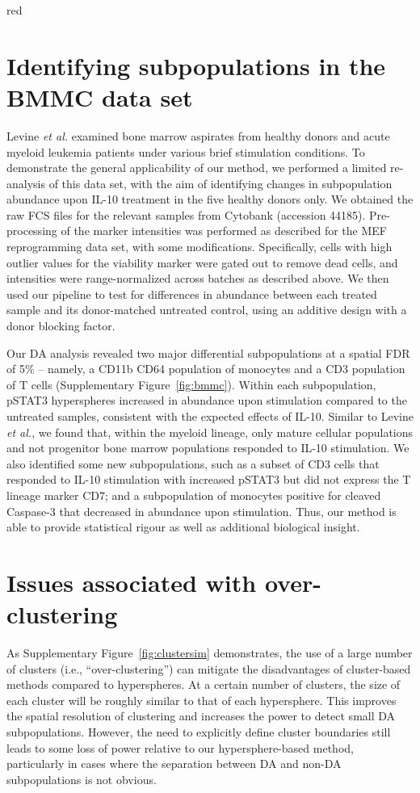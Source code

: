 \documentclass{article}
\begin{document}
\begin{color}{red}
\section{Identifying subpopulations in the BMMC data set}
\label{sec:bmmc}
Levine \textit{et al.} \cite{levine2015datadriven} examined bone marrow aspirates from healthy donors and acute myeloid leukemia patients under various brief stimulation conditions.
To demonstrate the general applicability of our method, we performed a limited re-analysis of this data set, with the aim of identifying changes in subpopulation abundance upon IL-10 treatment in the five healthy donors only.
We obtained the raw FCS files for the relevant samples from Cytobank (accession 44185).
Pre-processing of the marker intensities was performed as described for the MEF reprogramming data set, with some modifications.
Specifically, cells with high outlier values for the viability marker were gated out to remove dead cells, and intensities were range-normalized across batches as described above.
We then used our pipeline to test for differences in abundance between each treated sample and its donor-matched untreated control, using an additive design with a donor blocking factor.

Our DA analysis revealed two major differential subpopulations at a spatial FDR of 5\% -- namely, a CD11b\hi{} CD64\hi{} population of monocytes and a CD3\hi{} population of T cells (Supplementary Figure~\ref{fig:bmmc}).
Within each subpopulation, pSTAT3\hi{} hyperspheres increased in abundance upon stimulation compared to the untreated samples, consistent with the expected effects of IL-10.
Similar to Levine \textit{et al.}, we found that, within the myeloid lineage, only mature cellular populations and not progenitor bone marrow populations responded to IL-10 stimulation.
We also identified some new subpopulations, such as a subset of CD3\hi{} cells that responded to IL-10 stimulation with increased pSTAT3 but did not express the T lineage marker CD7; and a subpopulation of monocytes positive for cleaved Caspase-3 that decreased in abundance upon stimulation.
Thus, our method is able to provide statistical rigour as well as additional biological insight.

\section{Issues associated with over-clustering}
As Supplementary Figure~\ref{fig:clustersim} demonstrates, the use of a large number of clusters (i.e., ``over-clustering'') can mitigate the disadvantages of cluster-based methods compared to hyperspheres.
At a certain number of clusters, the size of each cluster will be roughly similar to that of each hypersphere.
This improves the spatial resolution of clustering and increases the power to detect small DA subpopulations.
However, the need to explicitly define cluster boundaries still leads to some loss of power relative to our hypersphere-based method, particularly in cases where the separation between DA and non-DA subpopulations is not obvious.


\end{color}
\end{document}

